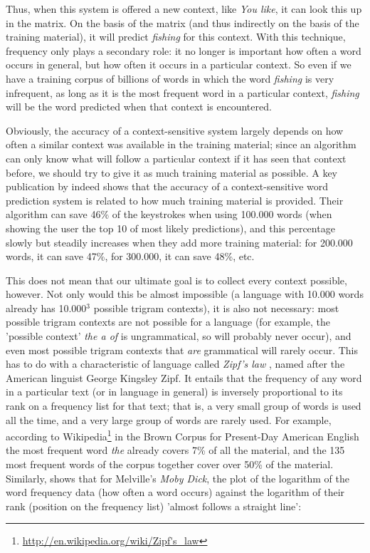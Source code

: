 \documentclass[12pt]{article}
\begin{document}
Thus, when this system is offered a new context, like \emph{You like}, it can look this up in the matrix. On the basis of the matrix (and thus indirectly on the basis of the training material), it will predict \emph{fishing} for this context. With this technique, frequency only plays a secondary role: it no longer is important how often a word occurs in general, but how often it occurs in a particular context. So even if we have a training corpus of billions of words in which the word \emph{fishing} is very infrequent, as long as it is the most frequent word in a particular context, \emph{fishing} will be the word predicted when that context is encountered.

Obviously, the accuracy of a context-sensitive system largely depends on how often a similar context was available in the training material; since an algorithm can only know what will follow a particular context if it has seen that context before, we should try to give it as much training material as possible. A key publication by  indeed shows that the accuracy of a context-sensitive word prediction system is related to how much training material is provided. Their algorithm can save 46\% of the keystrokes when using 100.000 words (when showing the user the top 10 of most likely predictions), and this percentage slowly but steadily increases when they add more training material: for 200.000 words, it can save 47\%, for 300.000, it can save 48\%, etc.

This does not mean that our ultimate goal is to collect every context possible, however. Not only would this be almost impossible (a language with 10.000 words already has 10.000$^3$ possible trigram contexts), it is also not necessary: most possible trigram contexts are not possible for a language (for example, the 'possible context' \emph{the a of} is ungrammatical, so will probably never occur), and even most possible trigram contexts that \emph{are} grammatical will rarely occur. This has to do with a characteristic of language called \emph{Zipf's law} \cite{zipf65}, named after the American linguist George Kingsley Zipf. It entails that the frequency of any word in a particular text (or in language in general) is inversely proportional to its rank on a frequency list for that text; that is, a very small group of words is used all the time, and a very large group of words are rarely used. For example, according to Wikipedia\footnote{\url{http://en.wikipedia.org/wiki/Zipf's\_law}} in the Brown Corpus for Present-Day American English the most frequent word \emph{the} already covers 7\% of all the material, and the 135 most frequent words of the corpus together cover over 50\% of the material. Similarly,  shows that for Melville's \emph{Moby Dick}, the plot of the logarithm of the word frequency data (how often a word occurs)  against the logarithm of their rank (position on the frequency list) 'almost follows a straight line': 
\end{document}
